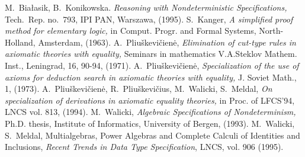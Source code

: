 \begin{thebibliography}{MM99}\MyLPar
{} M.~Bia{\l}asik, B.~Konikowska. 
   {\em Reasoning with Nondeterministic Specifications,} Tech.~Rep. no.~793, IPI PAN, Warszawa,
   (1995).
 S.~Kanger,
   {\em A simplified proof method for elementary logic,}
   in Comput. Progr. and Formal Systems, North-Holland, Amsterdam, (1963).
 A.~Pliu\v skevi\v cien\.e, 
   {\em Elimination of cut-type rules in axiomatic theories with equality,}
   Seminars in mathematics V.A.Steklov Mathem. Inst., Leningrad, 16, 90-94, (1971).
 A.~Pliu\v skevi\v cien\.e,
   {\em Specialization of the use of axioms for deduction search in 
   axiomatic theories with equality,}
   J. Soviet Math., 1, (1973).
 A.~Pliu\v skevi\v cien\.e, R.~Pliu\v skevi\v cius,
   M.~Walicki, S.~Meldal,
   {\em On specialization of derivations in axiomatic equality theories,}
   in Proc. of LFCS'94, LNCS vol. 813, (1994).
 M.~Walicki,
   {\em Algebraic Specifications of Nondeterminism,}
   Ph.D. thesis, Institute of Informatics, University of Bergen, (1993).
 M.~Walicki, S.~Meldal, 
   Multialgebras, Power Algebras and Complete Calculi of Identities and 
       Inclusions, {\em Recent Trends in Data Type  Specification}, LNCS, vol. 906 (1995).
\end{thebibliography} 


